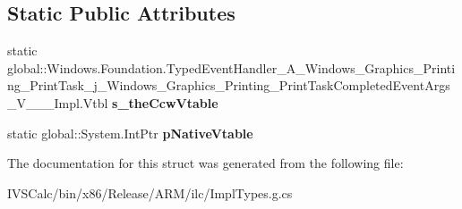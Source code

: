 \subsection*{Static Public Attributes}
\begin{DoxyCompactItemize}
\item 
\mbox{\label{struct_windows_1_1_foundation_1_1_typed_event_handler___a___windows___graphics___printing___prin4bbc544b6b23befe2861ab142a886e61_a5a2c8403493e330e7f12b64409ef1130}} 
static global\+::\+Windows.\+Foundation.\+Typed\+Event\+Handler\+\_\+\+A\+\_\+\+Windows\+\_\+\+Graphics\+\_\+\+Printing\+\_\+\+Print\+Task\+\_\+j\+\_\+\+Windows\+\_\+\+Graphics\+\_\+\+Printing\+\_\+\+Print\+Task\+Completed\+Event\+Args\+\_\+\+V\+\_\+\+\_\+\+\_\+\+Impl.\+Vtbl {\bfseries s\+\_\+the\+Ccw\+Vtable}
\item 
\mbox{\label{struct_windows_1_1_foundation_1_1_typed_event_handler___a___windows___graphics___printing___prin4bbc544b6b23befe2861ab142a886e61_a293be179b712a267da69d1ba7fa101ec}} 
static global\+::\+System.\+Int\+Ptr {\bfseries p\+Native\+Vtable}
\end{DoxyCompactItemize}


The documentation for this struct was generated from the following file\+:\begin{DoxyCompactItemize}
\item 
I\+V\+S\+Calc/bin/x86/\+Release/\+A\+R\+M/ilc/Impl\+Types.\+g.\+cs\end{DoxyCompactItemize}
